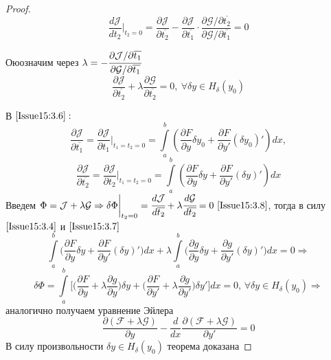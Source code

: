 \begin{proof}
\[ 
    \frac{d\mathcal{J}}{d t_2} \bigg|_{t_2=0} = \frac{\partial \mathcal{J}}{\partial \overline{t_2}} - \frac{\partial \mathcal{J}}{\partial \overline{t_1}}\cdot \frac{ \partial \mathcal{G}/\partial \overline{t_2}}{\partial \mathcal{G}/\partial \overline{t_1}}=0 
\]

Оюозначим через $\lambda = -\cfrac{\partial\mathcal{J}/\partial \overline{t_1}}{\partial\mathcal{G} / \partial \overline{t_1}}$
\begin{equation}
\label{Issue15:3.8}
\frac{\partial\mathcal{J}}{\partial\overline{t_2}}+\lambda \frac{\partial\mathcal{G}}{\partial\overline{t_2}}=0, ~\forall\delta y \in H_\delta(y_0) \end{equation}
\par
В $\eqref{Issue15:3.6}:$
\begin{equation}
    \label{Issue15:3.7}
    \frac{\partial\mathcal{J}}{\partial \overline{t_1}}=\frac{\partial \mathcal{J}}{\partial t_1}\bigg|_{t_1=t_2=0}=\int\limits_a^b \left( \frac{\partial F}{\partial y}\delta y_0 + \frac{\partial F}{\partial y'}(\delta y_0)' \right) dx,
    \end{equation}
    \begin{equation*}
    \frac{\partial\mathcal{J}}{\partial \overline{t_2}}=\frac{\partial \mathcal{J}}{\partial t_2}\bigg|_{t_1=t_2=0}=\int\limits_a^b \left( \frac{\partial F}{\partial y}\delta y+\frac{\partial F}{\partial y'}(\delta y)' \right) dx
\end{equation*}
Введем $\Phi = \mathcal{J}+\lambda\mathcal{G}\Rightarrow \delta \Phi\bigg|_{t_2=0}=\cfrac{d\mathcal{J}}{d\overline{t_2}}+\lambda\cfrac{d\mathcal{G}}{d\overline{t_2}}=0 ~\eqref{Issue15:3.8}$, тогда в силу $\eqref{Issue15:3.4}$ и $\eqref{Issue15:3.7}$ $$\int\limits_a^b\Big(\frac{\partial F}{\partial y}\delta y + \frac{\partial F}{\partial y'}(\delta y)'\Big)d x+\lambda\int\limits_a^b\Big(\frac{\partial g}{\partial y}\delta y + \frac{\partial g}{\partial y'}(\delta y)'\Big)d x=0\Rightarrow$$$$ \delta \Phi =\int\limits_a^b\Big[\Big(\frac{\partial F}{\partial y}+ \lambda\frac{\partial g}{\partial y}\Big)\delta y + \Big(\frac{\partial F}{\partial y'}+ \lambda\frac{\partial g}{\partial y'}\Big)\delta y'\Big]dx = 0, \, \forall \delta y \in H_\delta(y_0)\Rightarrow$$
аналогично получаем уравнение Эйлера
$$\frac{\partial(\mathcal{F}+\lambda\mathcal{G})}{\partial y}-\frac{d}{dx}\frac{\partial(\mathcal{F}+\lambda\mathcal{G})}{\partial y'}=0$$
В силу произвольности $\delta y\in H_\delta(y_0)$ теорема доказана
\end{proof}

